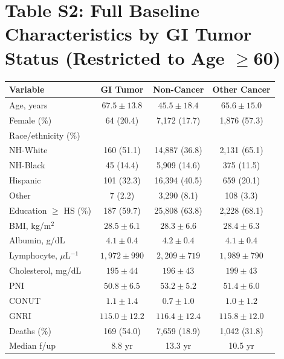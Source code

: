 \documentclass[11pt,a4paper]{article}
\begin{document}
\section*{Table S2: Full Baseline Characteristics by GI Tumor Status (Restricted to Age $\ge$60)}
\label{tab:s2}
\begin{center}
\begin{tabular}{lccc}
\toprule
Variable & GI Tumor & Non-Cancer & Other Cancer \\
\midrule
Age, years & $67.5\pm13.8$ & $45.5\pm18.4$ & $65.6\pm15.0$ \\
Female (\%) & 64 (20.4) & 7,172 (17.7) & 1,876 (57.3) \\
Race/ethnicity (\%) & & & \\
\hspace{0.5cm}NH-White & 160 (51.1) & 14,887 (36.8) & 2,131 (65.1) \\
\hspace{0.5cm}NH-Black &  45 (14.4) & 5,909 (14.6) & 375 (11.5) \\
\hspace{0.5cm}Hispanic & 101 (32.3) & 16,394 (40.5) & 659 (20.1) \\
\hspace{0.5cm}Other &  7 (2.2) & 3,290 (8.1) & 108 (3.3) \\
Education $\ge$ HS (\%) & 187 (59.7) & 25,808 (63.8) & 2,228 (68.1) \\
BMI, kg/m$^2$ & $28.5\pm6.1$ & $28.3\pm6.6$ & $28.4\pm6.3$ \\
Albumin, g/dL & $4.1\pm0.4$ & $4.2\pm0.4$ & $4.1\pm0.4$ \\
Lymphocyte, $\mu$L$^{-1}$ & $1,972\pm990$ & $2,209\pm719$ & $1,989\pm790$ \\
Cholesterol, mg/dL & $195\pm44$ & $196\pm43$ & $199\pm43$ \\
PNI & $50.8\pm6.5$ & $53.2\pm5.2$ & $51.4\pm6.0$ \\
CONUT & $1.1\pm1.4$ & $0.7\pm1.0$ & $1.0\pm1.2$ \\
GNRI & $115.0\pm12.2$ & $116.4\pm12.4$ & $115.8\pm12.0$ \\
Deaths (\%) & 169 (54.0) & 7,659 (18.9) & 1,042 (31.8) \\
Median f/up & 8.8 yr & 13.3 yr & 10.5 yr \\
\bottomrule
\end{tabular}
\end{center}
\end{document}
